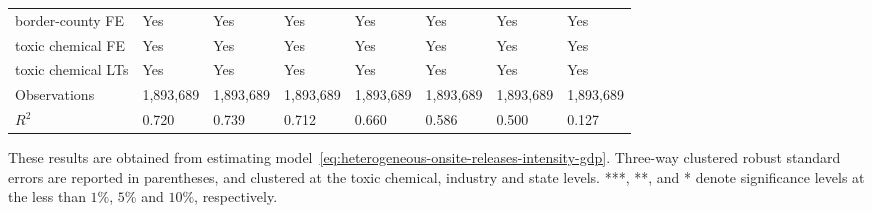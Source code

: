 \begin{table}[H]
{\begin{tabular}{@{}llllllll@{}}
            border-county FE                & Yes       & Yes           & Yes       & Yes          & Yes             & Yes           & Yes                 \\
            toxic chemical FE               & Yes       & Yes           & Yes       & Yes          & Yes             & Yes           & Yes                 \\
            toxic chemical LTs              & Yes       & Yes           & Yes       & Yes          & Yes             & Yes           & Yes                 \\\midrule
            Observations                    & 1,893,689 & 1,893,689     & 1,893,689 & 1,893,689    & 1,893,689       & 1,893,689     & 1,893,689           \\
            $R^2$                           & 0.720     & 0.739         & 0.712     & 0.660        & 0.586           & 0.500         & 0.127               \\ \bottomrule \bottomrule
        \end{tabular}%
    }
    \begin{minipage}{18cm}
        \vspace{0.05in}
        These results are obtained from estimating model~\ref{eq:heterogeneous-onsite-releases-intensity-gdp}. Three-way clustered robust standard errors are reported in parentheses, and clustered at the toxic chemical, industry and state levels. ***, **, and * denote significance levels at the less than $1\%$, $5\%$ and $10\%$, respectively.
    \end{minipage}
\end{table}